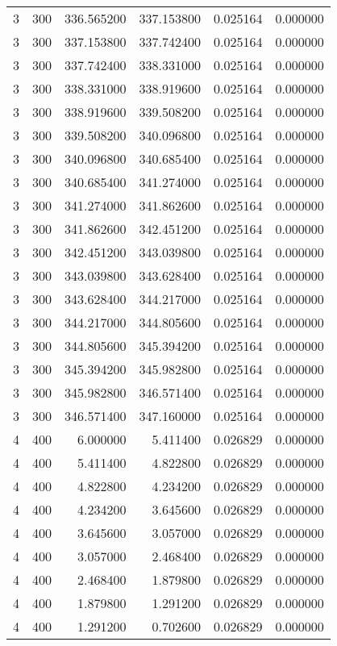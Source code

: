 \begin{longtable}{rrrrrr}
3 & 300 & 336.565200 & 337.153800 & 0.025164 & 0.000000 \\
3 & 300 & 337.153800 & 337.742400 & 0.025164 & 0.000000 \\
3 & 300 & 337.742400 & 338.331000 & 0.025164 & 0.000000 \\
3 & 300 & 338.331000 & 338.919600 & 0.025164 & 0.000000 \\
3 & 300 & 338.919600 & 339.508200 & 0.025164 & 0.000000 \\
3 & 300 & 339.508200 & 340.096800 & 0.025164 & 0.000000 \\
3 & 300 & 340.096800 & 340.685400 & 0.025164 & 0.000000 \\
3 & 300 & 340.685400 & 341.274000 & 0.025164 & 0.000000 \\
3 & 300 & 341.274000 & 341.862600 & 0.025164 & 0.000000 \\
3 & 300 & 341.862600 & 342.451200 & 0.025164 & 0.000000 \\
3 & 300 & 342.451200 & 343.039800 & 0.025164 & 0.000000 \\
3 & 300 & 343.039800 & 343.628400 & 0.025164 & 0.000000 \\
3 & 300 & 343.628400 & 344.217000 & 0.025164 & 0.000000 \\
3 & 300 & 344.217000 & 344.805600 & 0.025164 & 0.000000 \\
3 & 300 & 344.805600 & 345.394200 & 0.025164 & 0.000000 \\
3 & 300 & 345.394200 & 345.982800 & 0.025164 & 0.000000 \\
3 & 300 & 345.982800 & 346.571400 & 0.025164 & 0.000000 \\
3 & 300 & 346.571400 & 347.160000 & 0.025164 & 0.000000 \\
4 & 400 & 6.000000 & 5.411400 & 0.026829 & 0.000000 \\
4 & 400 & 5.411400 & 4.822800 & 0.026829 & 0.000000 \\
4 & 400 & 4.822800 & 4.234200 & 0.026829 & 0.000000 \\
4 & 400 & 4.234200 & 3.645600 & 0.026829 & 0.000000 \\
4 & 400 & 3.645600 & 3.057000 & 0.026829 & 0.000000 \\
4 & 400 & 3.057000 & 2.468400 & 0.026829 & 0.000000 \\
4 & 400 & 2.468400 & 1.879800 & 0.026829 & 0.000000 \\
4 & 400 & 1.879800 & 1.291200 & 0.026829 & 0.000000 \\
4 & 400 & 1.291200 & 0.702600 & 0.026829 & 0.000000 \\

\end{longtable}
